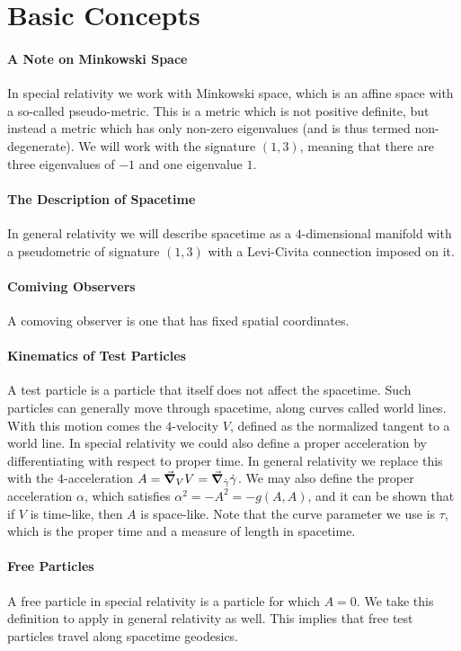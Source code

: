 \section{Basic Concepts}

\paragraph{A Note on Minkowski Space}
In special relativity we work with Minkowski space, which is an affine space with a so-called pseudo-metric. This is a metric which is not positive definite, but instead a metric which has only non-zero eigenvalues (and is thus termed non-degenerate). We will work with the signature $(1, 3)$, meaning that there are three eigenvalues of $-1$ and one eigenvalue $1$.

\paragraph{The Description of Spacetime}
In general relativity we will describe spacetime as a $4$-dimensional manifold with a pseudometric of signature $(1, 3)$ with a Levi-Civita connection imposed on it.

\paragraph{Comiving Observers}
A comoving observer is one that has fixed spatial coordinates.

\paragraph{Kinematics of Test Particles}
A test particle is a particle that itself does not affect the spacetime. Such particles can generally move through spacetime, along curves called world lines. With this motion comes the $4$-velocity $V$, defined as the normalized tangent to a world line. In special relativity we could also define a proper acceleration by differentiating with respect to proper time. In general relativity we replace this with the $4$-acceleration $A = \grad_{V}{V} = \grad_{\dot{\gamma}}{\dot{\gamma}}$.  We may also define the proper acceleration $\alpha$, which satisfies $\alpha^{2} = -A^{2} = -g(A, A)$, and it can be shown that if $V$ is time-like, then $A$ is space-like. Note that the curve parameter we use is $\tau$, which is the proper time and a measure of length in spacetime.

\paragraph{Free Particles}
A free particle in special relativity is a particle for which $A = 0$. We take this definition to apply in general relativity as well. This implies that free test particles travel along spacetime geodesics.


